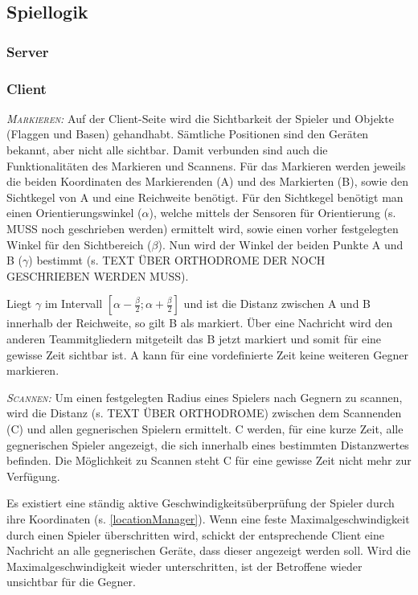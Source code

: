 \subsection{Spiellogik}

\subsubsection*{Server}


\subsubsection*{Client}
\textsc{\textit{Markieren: }}
Auf der Client-Seite wird die Sichtbarkeit der Spieler und Objekte (Flaggen und Basen) gehandhabt. Sämtliche Positionen sind den Geräten bekannt, aber nicht alle sichtbar. Damit verbunden sind auch die Funktionalitäten des Markieren und Scannens. Für das Markieren werden jeweils die beiden Koordinaten des Markierenden (A) und des Markierten (B), sowie den Sichtkegel von A und eine Reichweite benötigt. 
Für den Sichtkegel benötigt man einen Orientierungswinkel ($\alpha$), welche mittels der Sensoren für Orientierung (s. MUSS noch geschrieben werden) ermittelt wird, sowie einen vorher festgelegten Winkel für den Sichtbereich ($\beta$). Nun wird der Winkel der beiden Punkte A und B ($\gamma$) bestimmt (s. TEXT ÜBER ORTHODROME DER NOCH GESCHRIEBEN WERDEN MUSS).

Liegt $\gamma$ im Intervall $[ \alpha - \frac{\beta}{2}; \alpha + \frac{\beta}{2}]$ und ist die Distanz zwischen A und B innerhalb der Reichweite, so gilt B als markiert. Über eine Nachricht wird den anderen Teammitgliedern mitgeteilt das B jetzt markiert und somit für eine gewisse Zeit sichtbar ist. A kann für eine vordefinierte Zeit keine weiteren Gegner markieren.

\textsc{\textit{Scannen: }}
Um einen festgelegten Radius eines Spielers nach Gegnern zu scannen, wird die Distanz (s. TEXT ÜBER ORTHODROME) zwischen dem Scannenden (C) und allen gegnerischen Spielern ermittelt. C werden, für eine kurze Zeit, alle gegnerischen Spieler angezeigt, die sich innerhalb eines bestimmten Distanzwertes befinden. Die Möglichkeit zu Scannen steht C für eine gewisse Zeit nicht mehr zur Verfügung.

Es existiert eine ständig aktive Geschwindigkeitsüberprüfung der Spieler durch ihre Koordinaten (s. \ref{locationManager}). Wenn eine feste Maximalgeschwindigkeit durch einen Spieler überschritten wird, schickt der entsprechende Client eine Nachricht an alle gegnerischen Geräte, dass dieser angezeigt werden soll. Wird die Maximalgeschwindigkeit wieder unterschritten, ist der Betroffene wieder unsichtbar für die Gegner.